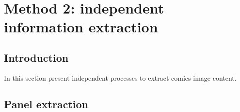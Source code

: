 \chapter{Method 2: independent information extraction}
\label{chap:independent}
\graphicspath{{./chapters/4-independent/figs/}}

\section{Introduction}
\label{sec:in:intro}

In this section present independent processes to extract comics image content.


\section{Panel extraction}
\label{sec:in:panel_extraction}


